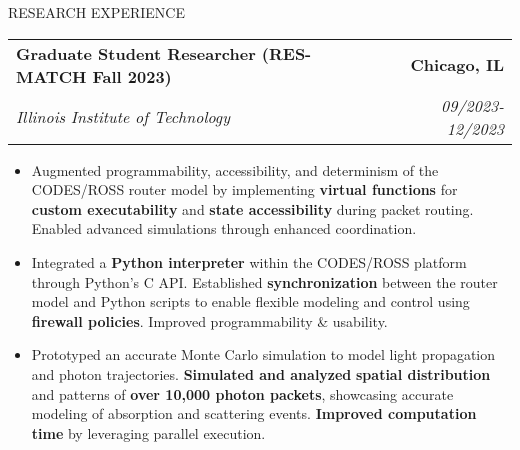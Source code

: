\documentclass{resume} %
\begin{document}
\vspace{-5pt} %
\begin{rSection}{RESEARCH EXPERIENCE}

   \begin{tabularx}{\textwidth}{@{}X r}
      \textbf{Graduate Student Researcher (RES-MATCH Fall 2023)} & \textbf{Chicago, IL} \\
      \textit{Illinois Institute of Technology} & \textit{09/2023-12/2023} \\
   \end{tabularx}


   \begin{minipage}[t]{1\textwidth}
      \begin{itemize}[left=0pt, nosep, before=\vspace{-0.5\baselineskip}]


\item \small Augmented programmability, accessibility, and determinism of the CODES/ROSS router model by implementing \textbf{virtual functions} for \textbf{custom executability} and \textbf{state accessibility} during packet routing. Enabled advanced simulations through enhanced coordination.

\item \small Integrated a \textbf{Python interpreter} within the CODES/ROSS platform through Python's C API. Established \textbf{synchronization} between the router model and Python scripts to enable flexible modeling and control using \textbf{firewall policies}. Improved programmability \& usability.

\item \small Prototyped an accurate Monte Carlo simulation to model light propagation and photon trajectories. \textbf{Simulated and analyzed} \textbf{spatial distribution} and patterns of \textbf{over 10,000 photon packets}, showcasing accurate modeling of absorption and scattering events. \textbf{Improved computation time} by leveraging parallel execution.

      \end{itemize}
   \end{minipage}


\end{rSection}
\end{document}
